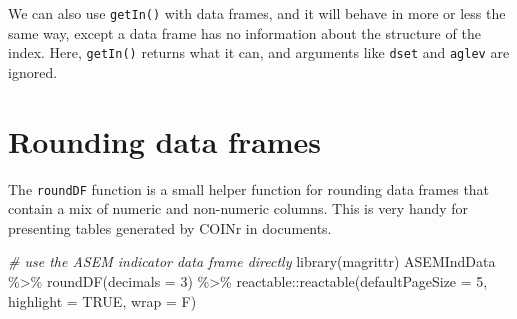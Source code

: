 \documentclass[
]{book}
\newenvironment{Shaded}{\begin{snugshade}}{\end{snugshade}}
\newcommand{\AttributeTok}[1]{\textcolor[rgb]{0.77,0.63,0.00}{#1}}
\newcommand{\CommentTok}[1]{\textcolor[rgb]{0.56,0.35,0.01}{\textit{#1}}}
\newcommand{\ConstantTok}[1]{\textcolor[rgb]{0.00,0.00,0.00}{#1}}
\newcommand{\DecValTok}[1]{\textcolor[rgb]{0.00,0.00,0.81}{#1}}
\newcommand{\DocumentationTok}[1]{\textcolor[rgb]{0.56,0.35,0.01}{\textbf{\textit{#1}}}}
\newcommand{\FunctionTok}[1]{\textcolor[rgb]{0.00,0.00,0.00}{#1}}
\newcommand{\NormalTok}[1]{#1}
\newcommand{\OtherTok}[1]{\textcolor[rgb]{0.56,0.35,0.01}{#1}}
\newcommand{\SpecialCharTok}[1]{\textcolor[rgb]{0.00,0.00,0.00}{#1}}
\newcommand{\StringTok}[1]{\textcolor[rgb]{0.31,0.60,0.02}{#1}}
\begin{document}
We can also use \texttt{getIn()} with data frames, and it will behave in more or less the same way, except a data frame has no information about the structure of the index. Here, \texttt{getIn()} returns what it can, and arguments like \texttt{dset} and \texttt{aglev} are ignored.

\begin{Shaded}
\end{Shaded}

\hypertarget{rounding-data-frames}{%
\section{Rounding data frames}\label{rounding-data-frames}}

The \texttt{roundDF} function is a small helper function for rounding data frames that contain a mix of numeric and non-numeric columns. This is very handy for presenting tables generated by COINr in documents.

\begin{Shaded}
\begin{Highlighting}[]
\CommentTok{\# use the ASEM indicator data frame directly}
\FunctionTok{library}\NormalTok{(magrittr)}
\NormalTok{ASEMIndData }\SpecialCharTok{\%\textgreater{}\%} \FunctionTok{roundDF}\NormalTok{(}\AttributeTok{decimals =} \DecValTok{3}\NormalTok{) }\SpecialCharTok{\%\textgreater{}\%}
\NormalTok{  reactable}\SpecialCharTok{::}\FunctionTok{reactable}\NormalTok{(}\AttributeTok{defaultPageSize =} \DecValTok{5}\NormalTok{, }\AttributeTok{highlight =} \ConstantTok{TRUE}\NormalTok{, }\AttributeTok{wrap =}\NormalTok{ F)}
\end{Highlighting}
\end{Shaded}
\end{document}
